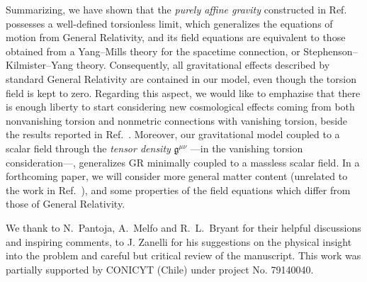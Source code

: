 \documentclass[aps,prd,12pt,twocolumn,superscriptaddress,showpacs,showkeys,reprint,longbibliography]{revtex4-1}
\renewcommand{\(}{\left(}
\renewcommand{\)}{\right)}
\renewcommand{\[}{\left[}
\renewcommand{\]}{\right]}
\begin{document}
Summarizing, we have shown that the  \emph{purely affine gravity} constructed in Ref.~\cite{Skirzewski:2014eta} possesses a well-defined torsionless limit, which generalizes the equations of motion  from General Relativity, and its field equations are equivalent to those obtained from a Yang--Mills theory for the spacetime connection, or Stephenson--Kilmister--Yang theory. Consequently, all gravitational effects described by standard General Relativity are contained in our model, even though the torsion field is kept to zero. Regarding this aspect, we would like to emphazise that there is enough liberty to start considering new cosmological effects coming from both nonvanishing torsion and nonmetric connections with vanishing torsion, beside the results reported in Ref.~\cite{Chen:2013kia,Chen:2013ota}.
Moreover, our gravitational model coupled to a scalar field through the \emph{tensor density} $\mathfrak{g}^{\mu\nu}$ ---in the vanishing torsion consideration---, generalizes GR minimally coupled to a massless scalar field. In a forthcoming paper, we will consider more general matter content (unrelated to the work in Ref.~\cite{Cook:2008mx}), and some properties of the field equations which differ from those of General Relativity.

\begin{acknowledgments}
  We thank to N.~Pantoja, A.~Melfo and R.~L.~Bryant for their helpful discussions and inspiring comments, to J. Zanelli for his suggestions on the physical insight into the problem and careful but critical review of the manuscript.
  This work was partially supported by CONICYT (Chile) under project No. 79140040.
\end{acknowledgments}

\appendix




\end{document}
